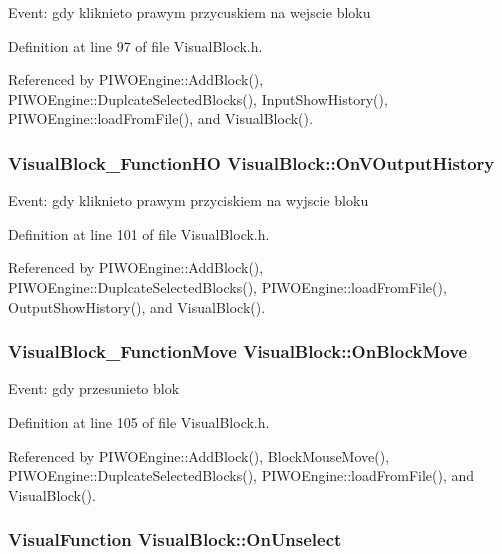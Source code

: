 Event: gdy kliknieto prawym przycuskiem na wejscie bloku 

Definition at line 97 of file VisualBlock.h.

Referenced by PIWOEngine::AddBlock(), PIWOEngine::DuplcateSelectedBlocks(), InputShowHistory(), PIWOEngine::loadFromFile(), and VisualBlock().\hypertarget{classVisualBlock_9a624de525f52a202cd57062f42332f3}{
\subsubsection[OnVOutputHistory]{\setlength{\rightskip}{0pt plus 5cm}VisualBlock\_\-FunctionHO {\bf VisualBlock::OnVOutputHistory}}}
\label{classVisualBlock_9a624de525f52a202cd57062f42332f3}


Event: gdy kliknieto prawym przyciskiem na wyjscie bloku 

Definition at line 101 of file VisualBlock.h.

Referenced by PIWOEngine::AddBlock(), PIWOEngine::DuplcateSelectedBlocks(), PIWOEngine::loadFromFile(), OutputShowHistory(), and VisualBlock().\hypertarget{classVisualBlock_a01dc407b0ccc5d72e4ba2b3cc67bbc0}{
\subsubsection[OnBlockMove]{\setlength{\rightskip}{0pt plus 5cm}VisualBlock\_\-FunctionMove {\bf VisualBlock::OnBlockMove}}}
\label{classVisualBlock_a01dc407b0ccc5d72e4ba2b3cc67bbc0}


Event: gdy przesunieto blok 

Definition at line 105 of file VisualBlock.h.

Referenced by PIWOEngine::AddBlock(), BlockMouseMove(), PIWOEngine::DuplcateSelectedBlocks(), PIWOEngine::loadFromFile(), and VisualBlock().\hypertarget{classVisualBlock_10238a1e11bc16de548c0e0ae7118ccf}{
\subsubsection[OnUnselect]{\setlength{\rightskip}{0pt plus 5cm}VisualFunction {\bf VisualBlock::OnUnselect}}}
\label{classVisualBlock_10238a1e11bc16de548c0e0ae7118ccf}


